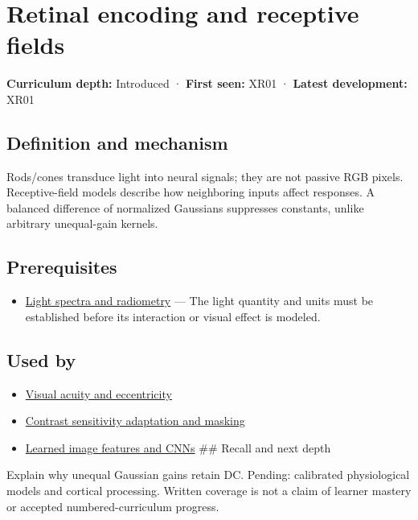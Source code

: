 \hypertarget{appendix-7281c15ac44a}{}
\section{Retinal encoding and receptive fields}\label{appendix-7281c15ac44a-retinal-encoding-and-receptive-fields}

\textbf{Curriculum depth:} Introduced · \textbf{First seen:} XR01 · \textbf{Latest development:} XR01

\subsection{Definition and mechanism}\label{appendix-7281c15ac44a-definition-and-mechanism}

Rods/cones transduce light into neural signals; they are not passive RGB pixels. Receptive-field models describe how neighboring inputs affect responses. A balanced difference of normalized Gaussians suppresses constants, unlike arbitrary unequal-gain kernels.

\subsection{Prerequisites}\label{appendix-7281c15ac44a-prerequisites}

\begin{itemize}
\tightlist
\item
  \hyperref[appendix-215c2570199b]{Light spectra and radiometry} --- The light quantity and units must be established before its interaction or visual effect is modeled.
\end{itemize}

\subsection{Used by}\label{appendix-7281c15ac44a-used-by}

\begin{itemize}
\item
  \hyperref[appendix-b491fc48c54b]{Visual acuity and eccentricity}
\item
  \hyperref[appendix-b3aa9e8e01ad]{Contrast sensitivity adaptation and masking}
\item
  \hyperref[appendix-47c51ea026fb]{Learned image features and CNNs} \#\# Recall and next depth
\end{itemize}

Explain why unequal Gaussian gains retain DC. Pending: calibrated physiological models and cortical processing. Written coverage is not a claim of learner mastery or accepted numbered-curriculum progress.


